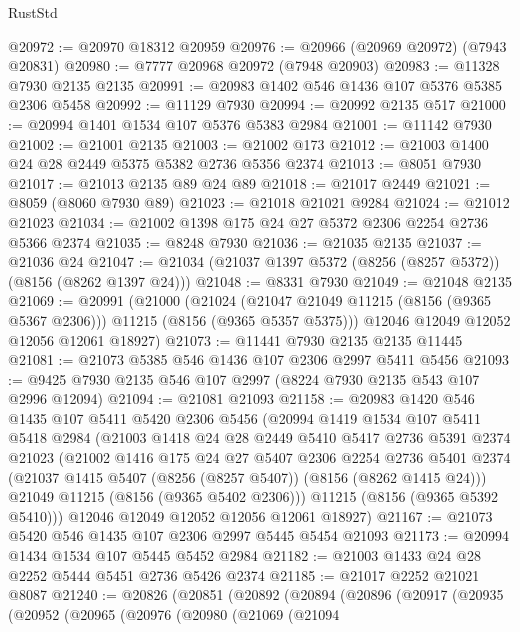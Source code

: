 \begin{lexlean}{RustStd}
\begin{coremodule}
@20972 := @20970 @18312 @20959
@20976 := @20966 (@20969 @20972) (@7943 @20831)
@20980 := @7777 @20968 @20972 (@7948 @20903)
@20983 := @11328 @7930 @2135 @2135
@20991 := @20983 @1402 @546 @1436 @107 @5376 @5385 @2306 @5458
@20992 := @11129 @7930
@20994 := @20992 @2135 @517
@21000 := @20994 @1401 @1534 @107 @5376 @5383 @2984
@21001 := @11142 @7930
@21002 := @21001 @2135
@21003 := @21002 @173
@21012 := @21003 @1400 @24 @28 @2449 @5375 @5382 @2736 @5356 @2374
@21013 := @8051 @7930
@21017 := @21013 @2135 @89 @24 @89
@21018 := @21017 @2449
@21021 := @8059 (@8060 @7930 @89)
@21023 := @21018 @21021 @9284
@21024 := @21012 @21023
@21034 := @21002 @1398 @175 @24 @27 @5372 @2306 @2254 @2736 @5366 @2374
@21035 := @8248 @7930
@21036 := @21035 @2135
@21037 := @21036 @24
@21047 := @21034 (@21037 @1397 @5372 (@8256 (@8257 @5372)) (@8156 (@8262 @1397 @24)))
@21048 := @8331 @7930
@21049 := @21048 @2135
@21069 := @20991
    (@21000
      (@21024 (@21047 @21049 @11215 (@8156 (@9365 @5367 @2306))) @11215 (@8156 (@9365 @5357 @5375)))
      @12046
      @12049
      @12052
      @12056
      @12061
      @18927)
@21073 := @11441 @7930 @2135 @2135 @11445
@21081 := @21073 @5385 @546 @1436 @107 @2306 @2997 @5411 @5456
@21093 := @9425 @7930 @2135 @546 @107 @2997 (@8224 @7930 @2135 @543 @107 @2996 @12094)
@21094 := @21081 @21093
@21158 := @20983
    @1420
    @546
    @1435
    @107
    @5411
    @5420
    @2306
    @5456
    (@20994
      @1419
      @1534
      @107
      @5411
      @5418
      @2984
      (@21003
        @1418
        @24
        @28
        @2449
        @5410
        @5417
        @2736
        @5391
        @2374
        @21023
        (@21002
          @1416
          @175
          @24
          @27
          @5407
          @2306
          @2254
          @2736
          @5401
          @2374
          (@21037 @1415 @5407 (@8256 (@8257 @5407)) (@8156 (@8262 @1415 @24)))
          @21049
          @11215
          (@8156 (@9365 @5402 @2306)))
        @11215
        (@8156 (@9365 @5392 @5410)))
      @12046
      @12049
      @12052
      @12056
      @12061
      @18927)
@21167 := @21073 @5420 @546 @1435 @107 @2306 @2997 @5445 @5454 @21093
@21173 := @20994 @1434 @1534 @107 @5445 @5452 @2984
@21182 := @21003 @1433 @24 @28 @2252 @5444 @5451 @2736 @5426 @2374
@21185 := @21017 @2252 @21021 @8087
@21240 := @20826
    (@20851
      (@20892
        (@20894
          (@20896
            (@20917
              (@20935
                (@20952
                  (@20965
                    (@20976
                      (@20980
                        (@21069
                          (@21094

\end{coremodule}
\end{lexlean}
